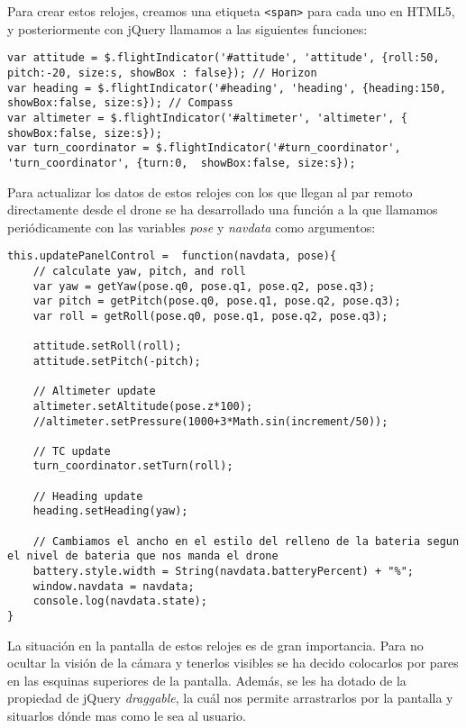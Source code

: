 Para crear estos relojes, creamos una etiqueta \texttt{<span>} para cada uno en HTML5, y posteriormente con jQuery llamamos a las siguientes funciones:\\

\begin{lstlisting}[caption=Creación de los relojes.]
var attitude = $.flightIndicator('#attitude', 'attitude', {roll:50, pitch:-20, size:s, showBox : false}); // Horizon
var heading = $.flightIndicator('#heading', 'heading', {heading:150, showBox:false, size:s}); // Compass
var altimeter = $.flightIndicator('#altimeter', 'altimeter', { showBox:false, size:s});
var turn_coordinator = $.flightIndicator('#turn_coordinator', 'turn_coordinator', {turn:0,  showBox:false, size:s}); 
\end{lstlisting}

Para actualizar los datos de estos relojes con los que llegan al par remoto directamente desde el drone se ha desarrollado una función a la que llamamos periódicamente con las variables \emph{pose} y \emph{navdata} como argumentos:\\

\begin{lstlisting}[caption=Actualización de los relojes.]
this.updatePanelControl =  function(navdata, pose){
    // calculate yaw, pitch, and roll
    var yaw = getYaw(pose.q0, pose.q1, pose.q2, pose.q3);
    var pitch = getPitch(pose.q0, pose.q1, pose.q2, pose.q3);
    var roll = getRoll(pose.q0, pose.q1, pose.q2, pose.q3);
    
    attitude.setRoll(roll);
    attitude.setPitch(-pitch);

    // Altimeter update
    altimeter.setAltitude(pose.z*100);
    //altimeter.setPressure(1000+3*Math.sin(increment/50));

    // TC update
    turn_coordinator.setTurn(roll);

    // Heading update
    heading.setHeading(yaw);
    
    // Cambiamos el ancho en el estilo del relleno de la bateria segun el nivel de bateria que nos manda el drone
    battery.style.width = String(navdata.batteryPercent) + "%";
    window.navdata = navdata;
    console.log(navdata.state);
}
\end{lstlisting}

La situación en la pantalla de estos relojes es de gran importancia. Para no ocultar la visión de la cámara y tenerlos visibles se ha decido colocarlos por pares en las esquinas superiores de la pantalla. Además, se les ha dotado de la propiedad de jQuery \emph{draggable}, la cuál nos permite arrastrarlos por la pantalla y situarlos dónde mas como le sea al usuario.\\

